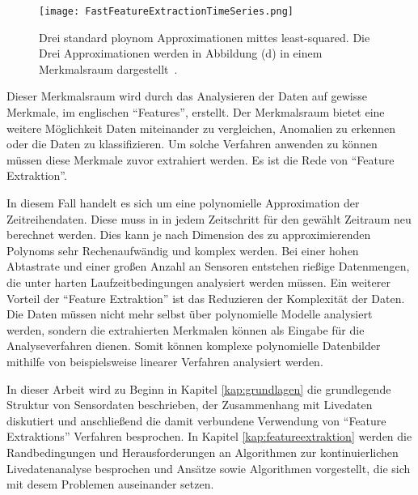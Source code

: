 \begin{figure}
  \centering
  \texttt{[image: FastFeatureExtractionTimeSeries.png]}
  \caption{Drei standard ploynom Approximationen mittes least-squared. Die Drei Approximationen werden in Abbildung (d) in einem Merkmalsraum dargestellt~\cite{gensler2015fast}.}
  \label{fig:FFETimeSeries}
\end{figure}


Dieser Merkmalsraum wird durch das Analysieren der Daten auf gewisse Merkmale, im englischen \enquote{Features}, erstellt.
Der Merkmalsraum bietet eine weitere Möglichkeit Daten miteinander zu vergleichen, Anomalien zu erkennen oder die Daten zu klassifizieren. 
Um solche Verfahren anwenden zu können müssen diese Merkmale zuvor extrahiert werden. 
Es ist die Rede von \enquote{Feature Extraktion}.

In diesem Fall handelt es sich um eine polynomielle Approximation der Zeitreihendaten. 
Diese muss in in jedem Zeitschritt für den gewählt Zeitraum neu berechnet werden. 
Dies kann je nach Dimension des zu approximierenden Polynoms sehr Rechenaufwändig und komplex werden.
Bei einer hohen Abtastrate und einer großen Anzahl an Sensoren entstehen rießige Datenmengen, die unter harten Laufzeitbedingungen analysiert werden müssen.
Ein weiterer Vorteil der \enquote{Feature Extraktion} ist das Reduzieren der Komplexität der Daten. Die Daten müssen nicht mehr selbst über polynomielle Modelle analysiert werden, sondern die extrahierten Merkmalen können als Eingabe für die Analyseverfahren dienen. Somit können komplexe polynomielle Datenbilder mithilfe von beispielsweise linearer Verfahren analysiert werden.

In dieser Arbeit wird zu Beginn in Kapitel \ref{kap:grundlagen} die grundlegende Struktur von Sensordaten beschrieben, der Zusammenhang mit Livedaten diskutiert und anschließend die damit verbundene Verwendung von \enquote{Feature Extraktions} Verfahren besprochen. 
In Kapitel \ref{kap:featureextraktion} werden die Randbedingungen und Herausforderungen an Algorithmen zur kontinuierlichen Livedatenanalyse besprochen und Ansätze sowie Algorithmen vorgestellt, die sich mit desem Problemen auseinander setzen.